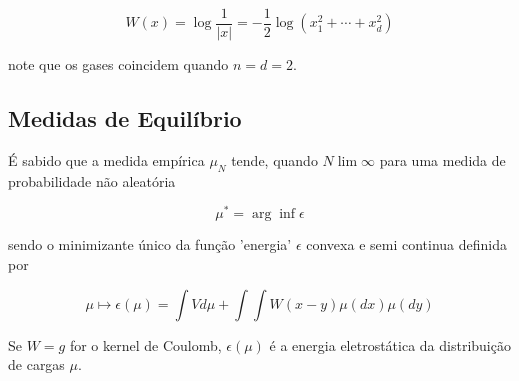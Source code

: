 \[
	W(x) = \log \frac{1}{|x|} = - \frac{1}{2} \log(x_1^2 + \cdots + x_d^2)
\]

note que os gases coincidem quando $n=d=2$.

\subsection{Medidas de Equilíbrio}

É sabido que a medida empírica $\mu_N$ tende, quando $N \lim \infty$ para uma medida de probabilidade não aleatória

\[
	\mu^* = \arg \inf {\epsilon}
\]

sendo o minimizante único da função 'energia' $\epsilon$ convexa e semi continua definida por

\[
	\mu \mapsto \epsilon(\mu) = \int V d\mu + \int \int W(x-y) \mu(dx) \mu(dy)
\]

Se $W = g$ for o kernel de Coulomb, $\epsilon(\mu)$  é a energia  eletrostática da distribuição de cargas $\mu$.



